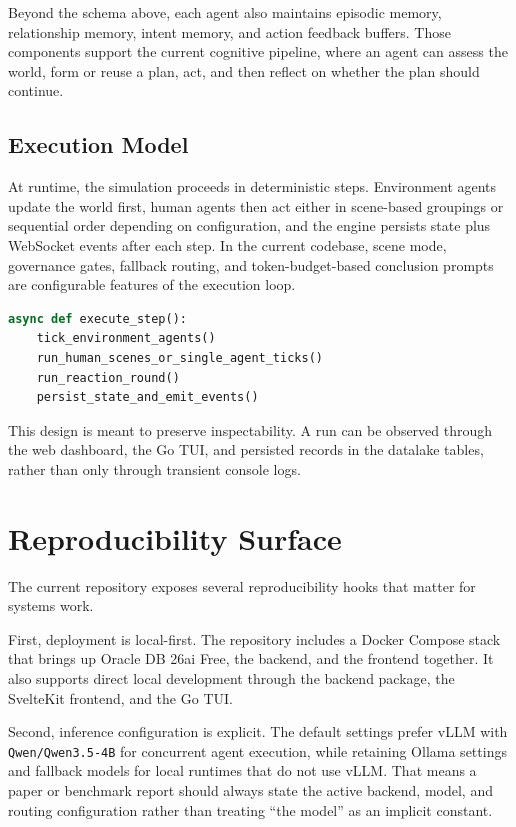 \documentclass{article}
\begin{document}
Beyond the schema above, each agent also maintains episodic memory, relationship memory, intent memory, and action feedback buffers. Those components support the current cognitive pipeline, where an agent can assess the world, form or reuse a plan, act, and then reflect on whether the plan should continue.

\subsection{Execution Model}
At runtime, the simulation proceeds in deterministic steps. Environment agents update the world first, human agents then act either in scene-based groupings or sequential order depending on configuration, and the engine persists state plus WebSocket events after each step. In the current codebase, scene mode, governance gates, fallback routing, and token-budget-based conclusion prompts are configurable features of the execution loop.

\begin{lstlisting}[language=Python, caption=High-Level Step Structure]
async def execute_step():
    tick_environment_agents()
    run_human_scenes_or_single_agent_ticks()
    run_reaction_round()
    persist_state_and_emit_events()
\end{lstlisting}

This design is meant to preserve inspectability. A run can be observed through the web dashboard, the Go TUI, and persisted records in the datalake tables, rather than only through transient console logs.

\section{Reproducibility Surface}
The current repository exposes several reproducibility hooks that matter for systems work.

First, deployment is local-first. The repository includes a Docker Compose stack that brings up Oracle DB 26ai Free, the backend, and the frontend together. It also supports direct local development through the backend package, the SvelteKit frontend, and the Go TUI.

Second, inference configuration is explicit. The default settings prefer vLLM with \texttt{Qwen/Qwen3.5-4B} for concurrent agent execution, while retaining Ollama settings and fallback models for local runtimes that do not use vLLM. That means a paper or benchmark report should always state the active backend, model, and routing configuration rather than treating ``the model'' as an implicit constant.
\end{document}
